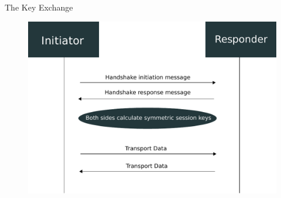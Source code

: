 \documentclass{beamer}
\begin{document}
    \begin{frame}{The Key Exchange}
    	\begin{figure}
			\includegraphics[width=\textwidth]{handshake.pdf}
		\end{figure}
    \end{frame}
\end{document}
